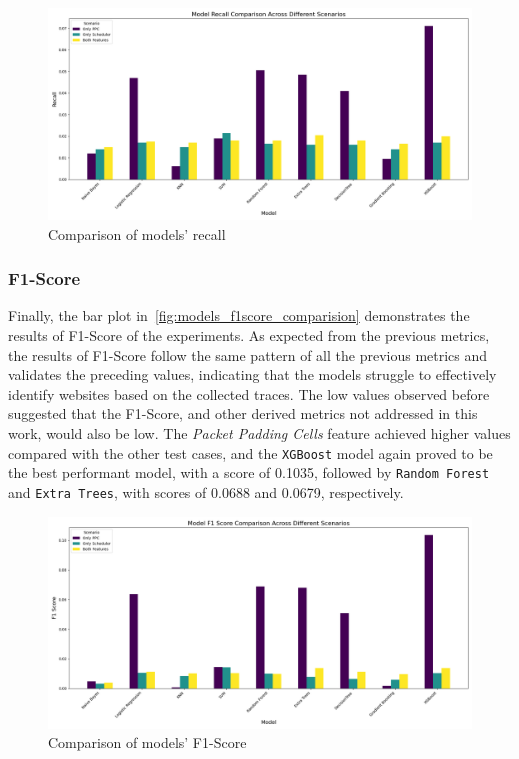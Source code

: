 \begin{figure}[!h]
  \centering
  \includegraphics[width=\textwidth]{Chapters/Figures/Plots/obs-no-control/obs_Recall_comparison.png}
  \caption{Comparison of models' recall}\label{fig:models_recall_comparision}
\end{figure}
\FloatBarrier

\subsubsection{F1-Score}

Finally, the bar plot in~\autoref{fig:models_f1score_comparision} demonstrates the results of F1-Score of the experiments. As expected from the previous metrics, the  results of F1-Score follow the same pattern of all the previous metrics and validates the preceding values, indicating that the models struggle to effectively identify websites based on the collected traces. The low values observed before suggested that the F1-Score, and other derived metrics not addressed in this work, would also be low. The \textit{Packet Padding Cells} feature achieved higher values compared with the other test cases, and the \texttt{XGBoost} model again proved to be the best performant model, with a score of 0.1035, followed by \texttt{Random Forest} and \texttt{Extra Trees}, with scores of 0.0688 and 0.0679, respectively.

\begin{figure}[!h]
  \centering
  \includegraphics[width=\textwidth]{Chapters/Figures/Plots/obs-no-control/obs_F1 Score_comparison.png}
  \caption{Comparison of models' F1-Score}\label{fig:models_f1score_comparision}
\end{figure}
\FloatBarrier


